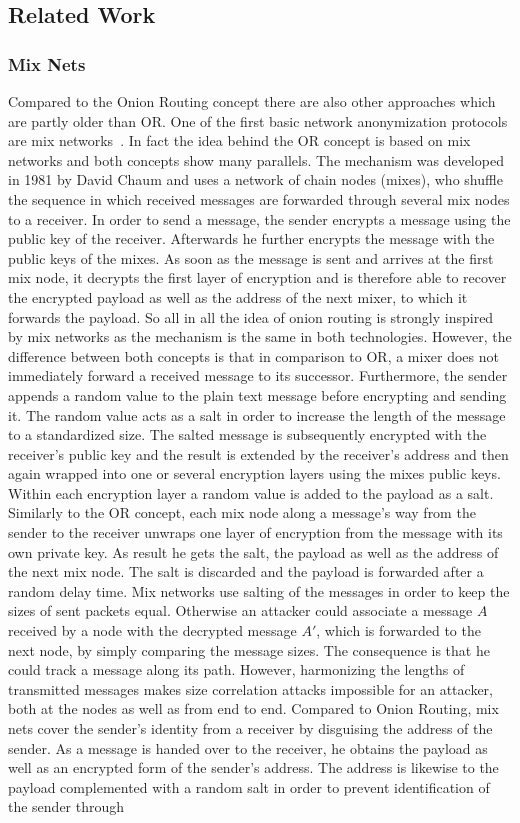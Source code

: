 \documentclass{sig-alternate}
\begin{document}
\subsection {Related Work}
 \subsubsection {Mix Nets}
Compared to the Onion Routing concept there are also other approaches which are partly older than OR. One of the first basic network anonymization protocols are mix networks~\cite{chaum1981untraceable}. In fact the idea behind the OR concept is based on mix networks and both concepts show many parallels. The mechanism was developed in 1981 by David Chaum and uses a network of chain nodes (mixes), who shuffle the sequence in which received messages are forwarded through several mix nodes to a receiver. In order to send a message, the sender encrypts a message using the public key of the receiver. Afterwards he further encrypts the message with the public keys of the mixes. As soon as the message is sent and arrives at the first mix node, it decrypts the first layer of encryption and is therefore able to recover the encrypted payload as well as the address of the next mixer, to which it forwards the payload. So all in all the idea of onion routing is strongly inspired by mix networks as the mechanism is the same in both technologies. However, the difference between both concepts is that in comparison to OR, a mixer does not immediately forward a received message to its successor. Furthermore, the sender appends a random value to the plain text message before encrypting and sending it. The random value acts as a salt in order to increase the length of the message to a standardized size. The salted message is subsequently encrypted with the receiver's public key and the result is extended by the receiver's address and then again wrapped into one or several encryption layers using the mixes public keys. Within each encryption layer a random value is added to the payload as a salt. Similarly to the OR concept, each mix node along a message's way from the sender to the receiver unwraps one layer of encryption from the message with its own private key. As result he gets the salt, the payload as well as the address of the next mix node. The salt is discarded and the payload is forwarded after a random delay time. Mix networks use salting of the messages in order to keep the sizes of sent packets equal. Otherwise an attacker could associate a message $A$ received by a node with the decrypted message $ A' $, which is forwarded to the next node, by simply comparing the message sizes. The consequence is that he could track a message along its path. However, harmonizing the lengths of transmitted messages makes size correlation attacks impossible for an attacker, both at the nodes as well as from end to end. Compared to Onion Routing, mix nets cover the sender's identity from a receiver by disguising the address of the sender. As a message is handed over to the receiver, he obtains the payload as well as an encrypted form of the sender's address. The address is likewise to the payload complemented with a random salt in order to prevent identification of the sender through 
\end{document}
